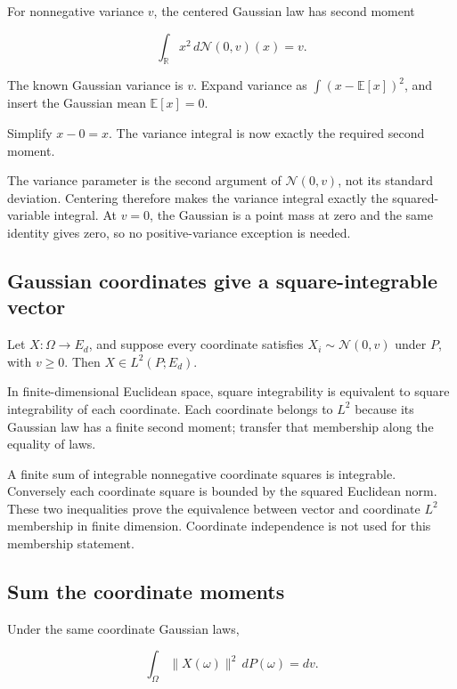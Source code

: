 \documentclass[11pt,a4paper]{article}
\begin{document}
For nonnegative variance \(v\), the centered Gaussian law has second moment

\[\int_{\mathbb R}x^2\,d\mathcal N(0,v)(x)=v.\]

The known Gaussian variance is \(v\). Expand variance as \(\int(x-\mathbb E[x])^2\), and insert the Gaussian mean \(\mathbb E[x]=0\).



Simplify \(x-0=x\). The variance integral is now exactly the required second moment.



The variance parameter is the second argument of \(\mathcal N(0,v)\), not its standard deviation. Centering therefore makes the variance integral exactly the squared-variable integral. At \(v=0\), the Gaussian is a point mass at zero and the same identity gives zero, so no positive-variance exception is needed.


\subsection{\texorpdfstring{Gaussian coordinates give a square-integrable vector}{Gaussian coordinates give a square-integrable vector}}


Let \(X:\Omega\to E_d\), and suppose every coordinate satisfies \(X_i\sim\mathcal N(0,v)\) under \(P\), with \(v\ge0\). Then \(X\in L^2(P;E_d)\).



In finite-dimensional Euclidean space, square integrability is equivalent to square integrability of each coordinate. Each coordinate belongs to \(L^2\) because its Gaussian law has a finite second moment; transfer that membership along the equality of laws.



A finite sum of integrable nonnegative coordinate squares is integrable. Conversely each coordinate square is bounded by the squared Euclidean norm. These two inequalities prove the equivalence between vector and coordinate \(L^2\) membership in finite dimension. Coordinate independence is not used for this membership statement.


\subsection{\texorpdfstring{Sum the coordinate moments}{Sum the coordinate moments}}


Under the same coordinate Gaussian laws,

\[\int_\Omega\|X(\omega)\|^2\,dP(\omega)=dv.\]
\end{document}
